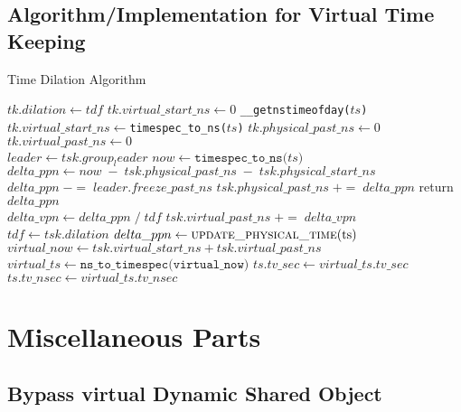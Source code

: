 \documentclass{acm_proc_article-sp}
\begin{document}
\subsection{Algorithm/Implementation for Virtual Time Keeping}
\begin{algorithm*}[t]
\caption{Time Dilation Algorithm}%
\label{Alg-DilateTimeKeeping}
\begin{algorithmic}[1]
    \State $tk.dilation \gets tdf$
    \State $tk.virtual\_start\_ns \gets 0$
    \State \texttt{\_\_getnstimeofday($ts$)}
    \State $tk.virtual\_start\_ns \gets $\texttt{timespec\_to\_ns($ts$)}
    \State $tk.physical\_past\_ns \gets 0$
    \State $tk.virtual\_past\_ns \gets 0$
\EndIf
\EndFunction
\\
\State $leader \gets tsk.group_leader$
\State $now \gets \texttt{timespec\_to\_ns($ts$)}$
\State $delta\_ppn \gets now \; - \; tsk.physical\_past\_ns \; - \; tsk.physical\_start\_ns$
\State $delta\_ppn \; -= \; leader.freeze\_past\_ns$
\State $tsk.physical\_past\_ns \; += \; delta\_ppn$
\State return $delta\_ppn$
\EndFunction
\\
	\State $delta\_vpn \gets delta\_ppn \; / \; tdf$
	\State $tsk.virtual\_past\_ns \; += \; delta\_vpn$
\EndIf
\EndFunction
\\
	\State $tdf \gets tsk.dilation$
	\State $delta\_ppn \gets \Call{update\_physical\_time}{$ts$}$
	\State {}
	\State $virtual\_now \gets tsk.virtual\_start\_ns + tsk.virtual\_past\_ns$
	\State $virtual\_ts \gets \texttt{ns\_to\_timespec(virtual\_now)}$
	\State $ts.tv\_sec \gets virtual\_ts.tv\_sec$
	\State $ts.tv\_nsec \gets virtual\_ts.tv\_nsec$
\EndIf
\EndFunction
\end{algorithmic}
\end{algorithm*}

\section{Miscellaneous Parts}
\subsection{Bypass virtual Dynamic Shared Object}
\end{document}
